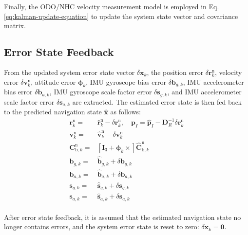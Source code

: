 \documentclass{article}
\begin{document}
Finally, the ODO/NHC velocity measurement model is employed in Eq.\eqref{eq:kalman-update-equation} to update the system state vector and covariance matrix.

\subsection{Error State Feedback}

From the updated system error state vector $\delta \boldsymbol{x}_{k}$, the position error $\delta \boldsymbol{r}_{k}^{\mathrm{n}}$, velocity error $\delta \boldsymbol{v}_{k}^{\mathrm{n}}$, attitude error $\boldsymbol{\phi}_{k}$, IMU gyroscope bias error $\delta \boldsymbol{b}_{g,k}$, IMU accelerometer bias error $\delta \boldsymbol{b}_{a,k}$, IMU gyroscope scale factor error $\delta \boldsymbol{s}_{g,k}$, and IMU accelerometer scale factor error $\delta \boldsymbol{s}_{a,k}$ are extracted. The estimated error state is then fed back to the predicted navigation state $\hat{\boldsymbol{x}}$ as follows:
\begin{equation}
    \begin{aligned}
        \boldsymbol{r}_{k}^{\mathrm{n}} =& \hat{\boldsymbol{r}}_{k}^{\mathrm{n}} - \delta \boldsymbol{r}_{k}^{\mathrm{n}}, \quad \boldsymbol{p}_{I} = \hat{\boldsymbol{p}}_{I} - \boldsymbol{D}_{R}^{-1} \delta \boldsymbol{r}_{k}^{\mathrm{n}} \\
        \boldsymbol{v}_{k}^{\mathrm{n}} =& \hat{\boldsymbol{v}}_{k}^{\mathrm{n}} - \delta \boldsymbol{v}_{k}^{\mathrm{n}} \\
        \mathbf{C}_{\mathrm{b},k}^{\mathrm{n}} =& \left[\boldsymbol{I}_{3} + \boldsymbol{\phi}_{k} \times \right] \hat{\mathbf{C}}_{\mathrm{b},k}^{\mathrm{n}} \\
        \boldsymbol{b}_{g,k} = & \hat{\boldsymbol{b}}_{g,k} + \delta \boldsymbol{b}_{g,k} \\
        \boldsymbol{b}_{a,k} = & \hat{\boldsymbol{b}}_{a,k} + \delta \boldsymbol{b}_{a,k} \\  
        \boldsymbol{s}_{g,k} = & \hat{\boldsymbol{s}}_{g,k} + \delta \boldsymbol{s}_{g,k} \\
        \boldsymbol{s}_{a,k} = & \hat{\boldsymbol{s}}_{a,k} + \delta \boldsymbol{s}_{a,k} \\
    \end{aligned}
\end{equation}

After error state feedback, it is assumed that the estimated navigation state no longer contains errors, and the system error state is reset to zero: $\delta \boldsymbol{x}_{k}=\boldsymbol{0}$.
\end{document}
